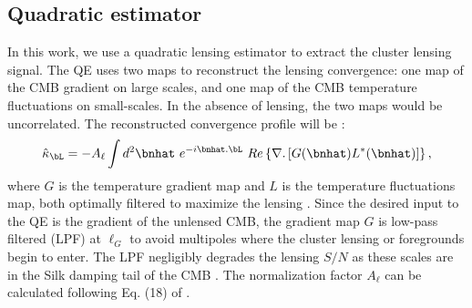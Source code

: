 \documentclass[usenatbib, twocolumn, nofootinbib, reprint]{aastex61}
\begin{document}
\subsection{Quadratic estimator}
\label{sec_method_QE}

In this work, we use a quadratic lensing estimator \citep{hu07} to extract the cluster lensing signal.
The QE uses two maps to reconstruct the lensing convergence: one map of the CMB gradient on large scales, and one map of the CMB temperature fluctuations on small-scales.
In the absence of lensing, the two maps would be uncorrelated. 
The reconstructed convergence profile will be \citep{hu07}:
\begin{equation}
\hat{\kappa}_{\bL} = -A_{\ell} \int d^{2}\bnhat\ e^{-i\bnhat.\bL}\ Re \left\{ \nabla . \left[ G(\bnhat) L^{*}(\bnhat)\right]\right\},
\label{eq_QE_kappa}
\end{equation} 
where $G$ is the temperature gradient map and $L$ is the temperature fluctuations map, both optimally filtered to maximize the lensing \snr.
Since the desired input to the QE is the gradient of the unlensed CMB, the gradient map $G$ is low-pass filtered (LPF) at $\ell_{G}$ %
\citep{hu07} to avoid multipoles where the cluster lensing or foregrounds begin to enter. 
The LPF negligibly degrades the lensing $S/N$ as these scales are in the Silk damping tail  of the CMB \citep{silk68}.
The normalization factor $A_{\ell}$ can be calculated following Eq. (18) of \cite{hu07}.
\end{document}
